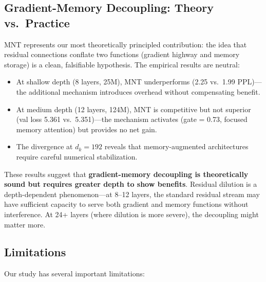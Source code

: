 \documentclass[10pt]{article}
\begin{document}
\subsection{Gradient-Memory Decoupling: Theory vs.\ Practice}

MNT represents our most theoretically principled contribution: the idea that residual connections conflate two functions (gradient highway and memory storage) is a clean, falsifiable hypothesis. The empirical results are neutral:

\begin{itemize}[leftmargin=*,itemsep=2pt]
    \item At shallow depth (8 layers, 25M), MNT underperforms (2.25 vs.\ 1.99 PPL)---the additional mechanism introduces overhead without compensating benefit.
    \item At medium depth (12 layers, 124M), MNT is competitive but not superior (val loss 5.361 vs.\ 5.351)---the mechanism activates (gate = 0.73, focused memory attention) but provides no net gain.
    \item The divergence at $d_k=192$ reveals that memory-augmented architectures require careful numerical stabilization.
\end{itemize}

These results suggest that \textbf{gradient-memory decoupling is theoretically sound but requires greater depth to show benefits}. Residual dilution is a depth-dependent phenomenon---at 8--12 layers, the standard residual stream may have sufficient capacity to serve both gradient and memory functions without interference. At 24+ layers (where dilution is more severe), the decoupling might matter more.

\subsection{Limitations}

Our study has several important limitations:
\end{document}
